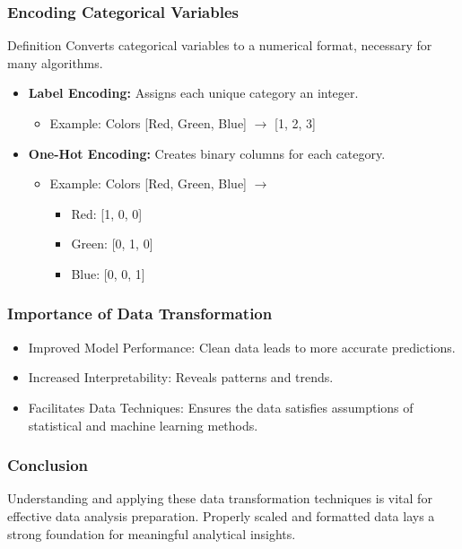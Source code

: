 \documentclass[aspectratio=169]{beamer}
\begin{document}
\begin{frame}[fragile]
    \frametitle{Encoding Categorical Variables}
    \begin{block}{Definition}
        Converts categorical variables to a numerical format, necessary for many algorithms.
    \end{block}
    \begin{itemize}
        \item \textbf{Label Encoding:} Assigns each unique category an integer.
        \begin{itemize}
            \item Example: Colors [Red, Green, Blue] $\rightarrow$ [1, 2, 3]
        \end{itemize}
        \item \textbf{One-Hot Encoding:} Creates binary columns for each category.
        \begin{itemize}
            \item Example: Colors [Red, Green, Blue] $\rightarrow$
            \begin{itemize}
                \item Red: [1, 0, 0]
                \item Green: [0, 1, 0]
                \item Blue: [0, 0, 1]
            \end{itemize}
        \end{itemize}
    \end{itemize}
\end{frame}

\begin{frame}[fragile]
    \frametitle{Importance of Data Transformation}
    \begin{itemize}
        \item Improved Model Performance: Clean data leads to more accurate predictions.
        \item Increased Interpretability: Reveals patterns and trends.
        \item Facilitates Data Techniques: Ensures the data satisfies assumptions of statistical and machine learning methods.
    \end{itemize}
\end{frame}

\begin{frame}[fragile]
    \frametitle{Conclusion}
    Understanding and applying these data transformation techniques is vital for effective data analysis preparation. Properly scaled and formatted data lays a strong foundation for meaningful analytical insights.
\end{frame}
\end{document}
